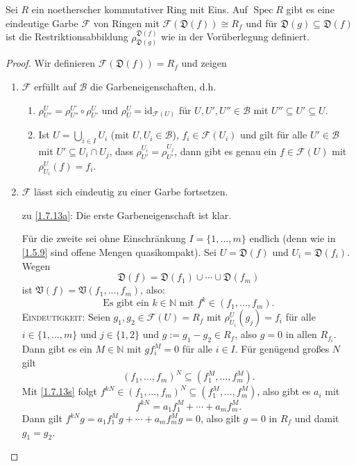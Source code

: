 \documentclass[a4paper,12pt,index=toc]{scrbook}
\theoremstyle{keinenummern} %
\def\V{\mathfrak{V}}
\newcommand{\D}{\mathfrak{D}}
\def\B{\mathcal{B}}
\newcommand{\F}{\mathcal{F}}
\newcommand{\Spec}{\operatorname{Spec}}
\newcommand{\id}{\mathrm{id}}
\newcommand{\da}{:=}
\renewcommand{\dotsc}{\ensuremath{\!...}}
\newcommand{\set}[1]{\ensuremath{\mathbb{#1}}}
\newcommand{\N}{\set{N}}
\begin{document}
\begin{prop}\label{1.7.13}
  Sei $R$ ein noetherscher kommutativer Ring mit Eins.
  Auf $\Spec R$ gibt es eine eindeutige Garbe $\F$ von Ringen mit $\F(\D(f))\cong R_f$ und für $\D(g)\subseteq
  \D(f)$ ist die Restriktionsabbildung $\rho_{\D(g)}^{\D(f)}$ wie in der Vorüberlegung definiert.
\end{prop}
\begin{proof}
  Wir definieren $\F(\D(f))=R_f$ und zeigen
  \begin{enumerate}
  \item{} $\F$ erfüllt auf $\B$ die Garbeneigenschaften, d.h.
    \begin{enumerate}[label=(\textsc{g}\arabic*)]
    \item\label{G1} $\rho_{U''}^U=\rho_{U''}^{U'}\circ\rho_{U'}^U$ und $\rho_U^U=\id_{\F(U)}$ für
      $U,U',U''\in\B$ mit $U''\subseteq U'\subseteq U$.
    \item\label{G2} Ist $U=\bigcup_{i\in I}U_i$ (mit $U,U_i\in\B$), $f_i\in\F(U_i)$ und gilt für alle
      $U'\in\B$ mit $U'\subseteq U_i\cap U_j$, dass $\rho_{U'}^{U_i}=\rho_{U'}^{U_j}$, dann gibt es genau ein
      $f\in \F(U)$ mit $\rho_{U_i}^U(f)=f_i$.
    \end{enumerate}
  \item{} $\F$ lässt sich eindeutig zu einer Garbe fortsetzen.
  \end{enumerate}
  \begin{enumerate}
  \item[zu] \ref{1.7.13a}: Die erste Garbeneigenschaft ist klar. 
  
  Für die zweite sei ohne Einschränkung $I=\{1,\dotsc,m\}$ endlich
    (denn wie in \cref{1.5.9} sind offene Mengen quasikompakt). Sei $U=\D(f)$ und $U_i=\D(f_i)$. Wegen
    \begin{equation*}\D(f)=\D(f_1)\cup\dotsm\cup \D(f_m)\end{equation*} ist $\V(f)=\V(f_1,\dotsc,f_m)$, also: 
    \begin{equation}\label{1.7.13s}\text{Es gibt ein }k\in\N\text{ mit }f^k\in(f_1,\dotsc,f_m).\tag{$*$}\end{equation}
%
    \textsc{Eindeutigkeit}: Seien $g_{1},g_{2}\in \F(U)=R_f$ mit $\rho^{U}_{U_{i}}(g_{j})=f_{i}$ für alle $i\in\{1,\dotsc,m\}$ und $j\in\{1,2\}$ und $g\da g_{1}-g_{2}\in R_{f}$, also $g=0$ in allen $R_{f_{i}}$. Dann gibt es ein $M\in\N$ mit
    $gf_i^M=0$ für alle $i\in I$. Für genügend großes $N$ gilt 
    \begin{equation*}(f_1,\dotsc,f_m)^N\subseteq(f_1^M,\dotsc,f_m^M).\end{equation*} 
    Mit \cref{1.7.13s}
    folgt $f^{kN}\in(f_1,\dotsc,f_m)^N\subseteq(f_1^M,\dotsc,f_m^M)$, also gibt es $a_i$ mit
    \begin{equation*}f^{kN}=a_1f_1^M+\dotsm+a_mf_m^M.\end{equation*}
    Dann gilt $f^{kN}g=a_1f_1^Mg+\dotsm+a_mf_m^Mg=0$, also gilt $g=0$ in $R_f$ und damit $g_{1}=g_{2}$.


\end{enumerate}
\end{proof}
\end{document}
